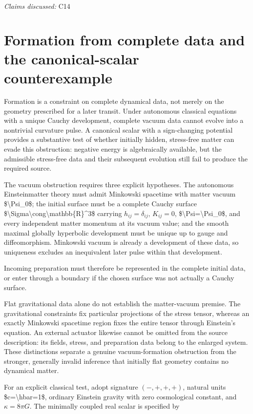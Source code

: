 \documentclass[11pt]{article}
\begin{document}
\textit{Claims discussed: }C14
\section{Formation from complete data and the canonical-scalar counterexample}
Formation is a constraint on complete dynamical data, not merely on the geometry prescribed for a later transit. Under autonomous classical equations with a unique Cauchy development, complete vacuum data cannot evolve into a nontrivial curvature pulse. A canonical scalar with a sign-changing potential provides a substantive test of whether initially hidden, stress-free matter can evade this obstruction: negative energy is algebraically available, but the admissible stress-free data and their subsequent evolution still fail to produce the required source.

The vacuum obstruction requires three explicit hypotheses. The autonomous Einstein\textendash{}matter theory must admit Minkowski spacetime with matter vacuum \$\textbackslash{}Psi\_0\$; the initial surface must be a complete Cauchy surface \$\textbackslash{}Sigma\textbackslash{}cong\textbackslash{}mathbb\{R\}\textasciicircum{}3\$ carrying $h_{ij}=\delta_{ij}$, $K_{ij}=0$, \$\textbackslash{}Psi=\textbackslash{}Psi\_0\$, and every independent matter momentum at its vacuum value; and the smooth maximal globally hyperbolic development must be unique up to gauge and diffeomorphism. Minkowski vacuum is already a development of these data, so uniqueness excludes an inequivalent later pulse within that development.

Incoming preparation must therefore be represented in the complete initial data, or enter through a boundary if the chosen surface was not actually a Cauchy surface.

Flat gravitational data alone do not establish the matter-vacuum premise. The gravitational constraints fix particular projections of the stress tensor, whereas an exactly Minkowski spacetime region fixes the entire tensor through Einstein's equation. An external actuator likewise cannot be omitted from the source description: its fields, stress, and preparation data belong to the enlarged system. These distinctions separate a genuine vacuum-formation obstruction from the stronger, generally invalid inference that initially flat geometry contains no dynamical matter.

For an explicit classical test, adopt signature $(-,+,+,+)$, natural units \$c=\textbackslash{}hbar=1\$, ordinary Einstein gravity with zero cosmological constant, and $\kappa=8\pi G$. The minimally coupled real scalar is specified by
\end{document}
